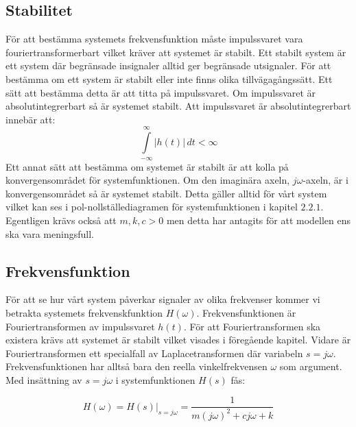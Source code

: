 \newpage
\subsection{Stabilitet}
För att bestämma systemets frekvensfunktion måste impulssvaret vara fouriertransformerbart vilket kräver att systemet är stabilt. Ett stabilt system är ett system där begränsade insignaler alltid ger begränsade utsignaler. För att bestämma om ett system är stabilt eller inte finns olika tillvägagångssätt. Ett sätt att bestämma detta är att titta på impulssvaret. Om impulssvaret är absolutintegrerbart så är systemet stabilt. Att impulssvaret är absolutintegrerbart innebär att:
$$\int\limits_{-\infty}^{\infty}\big|h(t)\big|\,dt < \infty$$
Ett annat sätt att bestämma om systemet är stabilt är att kolla på konvergensområdet för systemfunktionen. Om den imaginära axeln, $j\omega$-axeln, är i konvergensområdet så är systemet stabilt.
Detta gäller alltid för vårt system vilket kan ses i pol-nollställediagramen för systemfunktionen i kapitel $2.2.1$. Egentligen krävs också att $m,k,c>0$ men detta har antagits för att modellen ens ska vara meningsfull.
\subsection{Frekvensfunktion}
För att se hur vårt system påverkar signaler av olika frekvenser kommer vi betrakta systemets frekvenskfunktion $H(\omega)$.
Frekvensfunktionen är Fouriertransformen av impulssvaret $h(t)$. För att Fouriertransformen ska existera krävs att systemet är stabilt vilket visades i föregående kapitel. Vidare är Fouriertransformen ett specialfall av Laplacetransformen där variabeln $s = j\omega$. Frekvensfunktionen har alltså bara den reella vinkelfrekvensen $\omega$ som argument. Med insättning av $s = j\omega$ i systemfunktionen $H(s)$ fås: 

$$H(\omega)=H(s)\bigg\rvert_{s=j\omega}=\dfrac{1}{m(j\omega)^2+cj\omega+k}$$

\newpage
